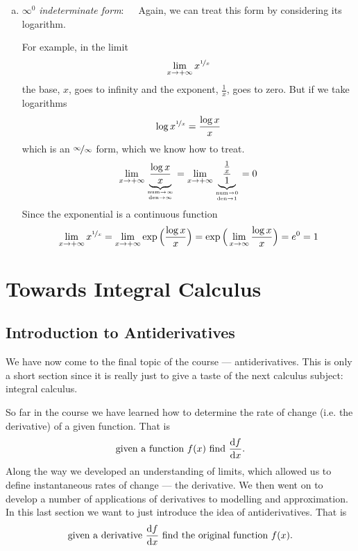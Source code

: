 \begin{enumerate}[(a)]
\item $\infty^0$ \emph{indeterminate form}:\ \ \ Again, we can treat this form by
considering its logarithm.
\begin{eg}\label{eg:hopitalN}
For example, in the limit
\begin{align*}
\lim_{x\rightarrow +\infty}x^{\nicefrac{1}{x}}
\end{align*}
the base, $x$, goes to infinity and the exponent, $\frac{1}{x}$, goes
to zero. But if we take logarithms
\begin{align*}
\log x^{\nicefrac{1}{x}} =\frac{\log x}{x}
\end{align*}
which is an $\nicefrac\infty\infty$ form, which we know how to treat.
\begin{align*}
\lim_{x\rightarrow +\infty}\underbrace{\frac{\log x}{x}}_{\atp
        {\mathrm{num}\rightarrow \infty}
        {\mathrm{den}\rightarrow \infty}}
=\lim_{x\rightarrow +\infty}\underbrace{\frac{\frac{1}{x}}{1}}_{\atp
        {\mathrm{num}\rightarrow 0}
        {\mathrm{den}\rightarrow 1}}
=0
\end{align*}
Since the exponential is a continuous function
\begin{align*}
\lim_{x\rightarrow +\infty}x^{\nicefrac{1}{x}}
=\lim_{x\rightarrow +\infty}\exp\Big(\frac{\log x}{x}\Big)
=\exp\Big(\lim_{x\rightarrow \infty}\frac{\log x}{x}\Big)
=e^0
=1
\end{align*}
\end{eg}
\end{enumerate}


\chapter{Towards Integral Calculus}


\section{Introduction to Antiderivatives}\label{sec antidiff}
We have now come to the final topic of the course --- antiderivatives. This is only a
short section since it is really just to give a taste of the next calculus subject:
integral calculus.

So far in the course we have learned how to determine the rate of change (i.e. the
derivative) of a given function. That is
\begin{align*}
  \text{given a function } f(x) \text{ find } \diff{f}{x}.
\end{align*}
Along the way we developed an understanding of limits, which allowed us to define
instantaneous rates of change --- the derivative. We then went on to develop a number of
applications of derivatives to modelling and approximation. In this last section we want
to just introduce the idea of antiderivatives. That is
\begin{align*}
  \text{given a derivative } \diff{f}{x} \text{ find the original function } f(x).
\end{align*}

